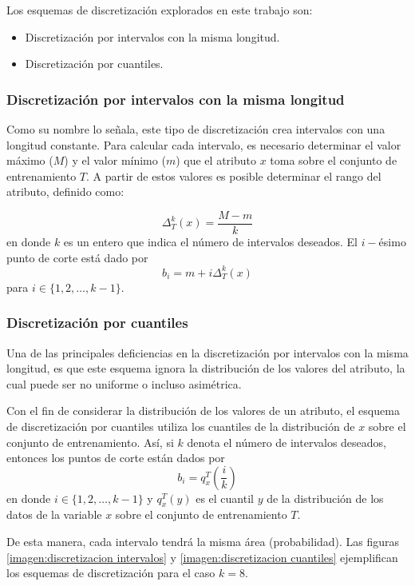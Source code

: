 \documentclass[12pt]{report}
\theoremstyle{break}
\theoremstyle{break}
\begin{document}
Los esquemas de discretización explorados en este trabajo son:

\begin{itemize}
\item Discretización por intervalos con la misma longitud.
\item Discretización por cuantiles.
\end{itemize}

\subsubsection{Discretización por intervalos con la misma longitud}
Como su nombre lo señala, este tipo de discretización crea intervalos con una longitud constante. Para calcular cada intervalo, es necesario determinar el valor máximo ($M$) y el valor mínimo ($m$) que el atributo $x$ toma sobre el conjunto de entrenamiento $T$. A partir de estos valores es posible determinar el rango del atributo, definido como:

$$
\Delta_{T}^{k}(x) = \dfrac{M-m}{k}
$$
en donde $k$ es un entero que indica el número de intervalos deseados. El $i-$ésimo punto de corte está dado por
$$
b_i = m + i \Delta_{T}^{k}(x)
$$
para $i \in \{1, 2, \ldots, k - 1 \}$.

\subsubsection{Discretización por cuantiles}
Una de las principales deficiencias en la discretización por intervalos con la misma longitud, es que este esquema ignora la distribución de los valores del atributo, la cual puede ser no uniforme o incluso asimétrica.

Con el fin de considerar la distribución de los valores de un atributo, el esquema de discretización por cuantiles utiliza los cuantiles de la distribución de $x$ sobre el conjunto de entrenamiento. Así, si $k$ denota el número de intervalos deseados, entonces los puntos de corte están dados por
$$
b_i = q_{x}^{T} \left(\frac{i}{k} \right)
$$
en donde $i \in \{1, 2, \ldots, k - 1 \}$ y $q_{x}^{T} \left(y \right)$ es el cuantil $y$ de la distribución de los datos de la variable $x$ sobre el conjunto de entrenamiento $T$.

De esta manera, cada intervalo tendrá la misma área (probabilidad). Las figuras \ref{imagen:discretizacion intervalos} y \ref{imagen:discretizacion cuantiles} ejemplifican los esquemas de discretización para el caso $k = 8$.
\end{document}
